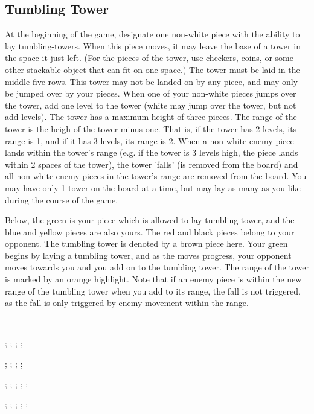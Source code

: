\documentclass[../rulebook.tex]{subfiles}
\begin{document}
\subsection*{Tumbling Tower}

At the beginning of the game,
designate one non-white piece with the ability to lay tumbling-towers.
When this piece moves,
it may leave the base of a tower in the space it just left.
(For the pieces of the tower, use checkers, coins,
or some other stackable object that can fit on one space.)
The tower must be laid in the middle five rows.
This tower may not be landed on by any piece,
and may only be jumped over by your pieces.
When one of your non-white pieces jumps over the tower,
add one level to the tower
(white may jump over the tower, but not add levels).
The tower has a maximum height of three pieces.
The range of the tower is the heigh of the tower minus one.
That is, if the tower has 2 levels, its range is 1,
and if it has 3 levels, its range is 2.
When a non-white enemy piece lands within the tower's range
(e.g. if the tower is 3 levels high, the piece lands within
2 spaces of the tower),
the tower 'falls' (is removed from the board)
and all non-white enemy pieces in the tower's range
are removed from the board. 
You may have only 1 tower on the board at a time,
but may lay as many as you like during the course of the game. 

Below, the green is your piece which is allowed to lay tumbling tower,
and the blue and yellow pieces are also yours.
The red and black pieces belong to your opponent.
The tumbling tower is denoted by a brown piece here.
Your green begins by laying a tumbling tower, and as the moves progress,
your opponent moves towards you and you add on to the tumbling tower.
The range of the tower is marked by an orange highlight.
Note that if an enemy piece is within the new range of the tumbling tower
when you add to its range, the fall is not triggered, as the fall is
only triggered by enemy movement within the range.

\

\begin{center}
  \begin{struggleboard}
    ;
    ;
    ;
    ;
  \end{struggleboard}
  \begin{struggleboard}
    ;
    ;
    ;
    ;
  \end{struggleboard}
  \begin{struggleboard}
    ;
    ;
    ;
    ;
    ;
  \end{struggleboard}
  \begin{struggleboard}
    ;
    ;
    ;
    ;
    ;
  \end{struggleboard}
\end{center}
\end{document}
